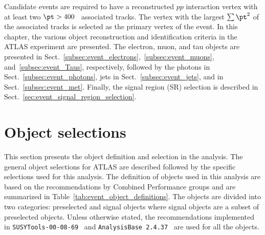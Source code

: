 Candidate events are required to have a reconstructed $pp$ interaction vertex with at least two $\pt > 400$~{\MeV} associated tracks.
The vertex with the largest $\sum \pt^{2}$ of the associated tracks is selected as the primary vertex of the event. 
In this chapter, the various object reconstruction and  identification criteria in the ATLAS experiment are presented.
The electron, muon, and tau objects are presented in Sect.~\ref{subsec:event_electrons},~\ref{subsec:event_muons}, and~\ref{subsec:event_Taus}, respectively, followed by the photons in Sect.~\ref{subsec:event_photons}, jets in Sect.~\ref{subsec:event_jets}, and \met in Sect.~\ref{subsec:event_met}.
Finally, the signal region (SR) selection is described in Sect.~\ref{sec:event_signal_region_selection}.


\section{Object selections}
\label{sec:event_object_selections}
This section presents the object definition and selection in the analysis.
The general object selections for ATLAS are described followed by the specific selections used for this analysis.
The definition of objects used in this analysis are based on the recommendations by Combined Performance groups and are summarized in Table~\ref{tab:event_object_definitions}.
The objects are divided into two categories: preselected and signal objects where signal objects are a subset of preselected objects.
Unless otherwise stated, the recommendations implemented in \texttt{SUSYTools-00-08-69}~\cite{SUSYToolsV8} and \texttt{AnalysisBase 2.4.37}~\cite{AnalysisBase} are used for all the objects.

